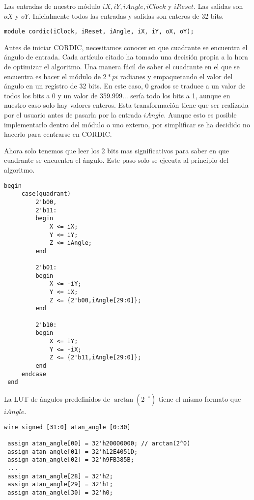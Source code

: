 Las entradas de nuestro módulo $iX, iY, iAngle, iClock$ y $iReset$. Las salidas son $oX$ y $oY$. Inicialmente todos las entradas y salidas son enteros de 32 bits.

\begin{lstlisting}[caption={Módulo CORDIC}]
module cordic(iClock, iReset, iAngle, iX, iY, oX, oY);
\end{lstlisting}

Antes de iniciar CORDIC, necesitamos conocer en que cuadrante se encuentra el ángulo de entrada. Cada artículo citado ha tomado una decisión propia a la hora de optimizar el algoritmo. Una manera fácil de saber el cuadrante en el que se encuentra es hacer el módulo de $2*pi$ radianes y empaquetando el valor del ángulo en un registro de 32 bits. En este caso, 0 grados se traduce a un valor de todos los bits a 0 y un valor de 359.999... sería todo los bits a 1, aunque en nuestro caso solo hay valores enteros. Esta transformación tiene que ser realizada por el usuario antes de pasarla por la entrada $iAngle$. Aunque esto es posible implementarlo dentro del módulo o uno externo, por simplificar se ha decidido no hacerlo para centrarse en CORDIC.

Ahora solo tenemos que leer los 2 bits mas significativos para saber en que cuadrante se encuentra el ángulo. Este paso solo se ejecuta al principio del algoritmo.
\begin{lstlisting}[caption={Pre-rotación de iAngle pasado por el usuario.}]
 begin
     case(quadrant)
         2'b00,
         2'b11: 
         begin
             X <= iX;
             Y <= iY;
             Z <= iAngle;
         end

         2'b01:
         begin
             X <= -iY;
             Y <= iX;
             Z <= {2'b00,iAngle[29:0]};
         end

         2'b10:
         begin
             X <= iY;
             Y <= -iX;
             Z <= {2'b11,iAngle[29:0]};
         end
     endcase
 end

\end{lstlisting}
La LUT de ángulos predefinidos de $\arctan(2^{-i})$ tiene el mismo formato que $iAngle$.
\begin{lstlisting}[caption={Tabla de $\arctan$.}]
wire signed [31:0] atan_angle [0:30]

 assign atan_angle[00] = 32'h20000000; // arctan(2^0)
 assign atan_angle[01] = 32'h12E4051D; 
 assign atan_angle[02] = 32'h9FB385B; 
 ...
 assign atan_angle[28] = 32'h2;
 assign atan_angle[29] = 32'h1;
 assign atan_angle[30] = 32'h0;
\end{lstlisting}

